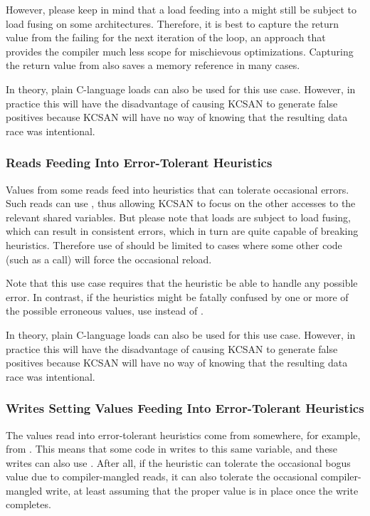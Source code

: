 However, please keep in mind that a  load feeding into
a  might still be subject to load fusing on some
architectures.
Therefore, it is best to capture the return value from the failing
 for the next iteration of the loop, an approach that
provides the compiler much less scope for mischievous optimizations.
Capturing the return value from  also saves a memory reference
in many cases.

In theory, plain C-language loads can also be used for this use case.
However, in practice this will have the disadvantage of causing KCSAN
to generate false positives because KCSAN will have no way of knowing
that the resulting data race was intentional.


\subsubsection{Reads Feeding Into Error-Tolerant Heuristics}

Values from some reads feed into heuristics that can tolerate occasional
errors.
Such reads can use , thus allowing KCSAN to focus on
the other accesses to the relevant shared variables.
But please note that  loads are subject to load fusing,
which can result in consistent errors, which in turn are quite capable
of breaking heuristics.
Therefore use of  should be limited to cases where some other
code (such as a  call) will force the occasional reload.

Note that this use case requires that the heuristic be able to handle
any possible error.
In contrast, if the heuristics might be fatally confused by one or more of
the possible erroneous values, use  instead of .

In theory, plain C-language loads can also be used for this use case.
However, in practice this will have the disadvantage of causing KCSAN
to generate false positives because KCSAN will have no way of knowing
that the resulting data race was intentional.


\subsubsection{Writes Setting Values Feeding Into Error-Tolerant Heuristics}

The values read into error-tolerant heuristics come from somewhere,
for example, from .
This means that some code in  writes to this same variable,
and these writes can also use .
After all, if the heuristic can tolerate the occasional bogus value
due to compiler-mangled reads, it can also tolerate the occasional
compiler-mangled write, at least assuming that the proper value is in
place once the write completes.

